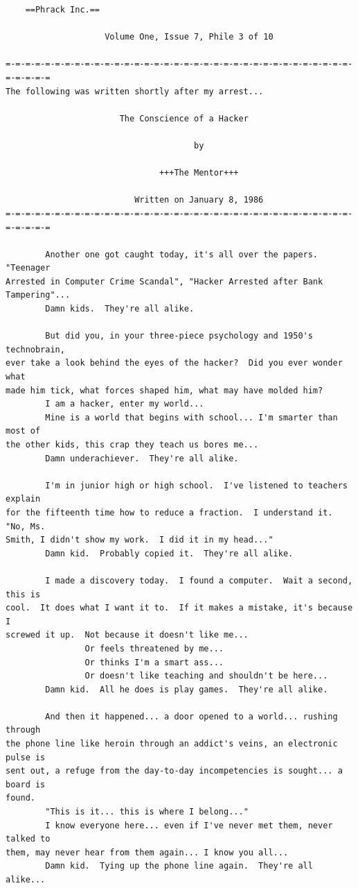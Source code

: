 \documentclass [titlepage, 12pt]{article}
\begin{document}
\pagebreak
\setlength\hoffset{-1cm}
\begin{verbatim}
    ==Phrack Inc.==

                    Volume One, Issue 7, Phile 3 of 10

=-=-=-=-=-=-=-=-=-=-=-=-=-=-=-=-=-=-=-=-=-=-=-=-=-=-=-=-=-=-=-=-=-=-=-=-=-=-=-=
The following was written shortly after my arrest...

                       The Conscience of a Hacker

                                      by

                               +++The Mentor+++

                          Written on January 8, 1986
=-=-=-=-=-=-=-=-=-=-=-=-=-=-=-=-=-=-=-=-=-=-=-=-=-=-=-=-=-=-=-=-=-=-=-=-=-=-=-=

        Another one got caught today, it's all over the papers.  "Teenager
Arrested in Computer Crime Scandal", "Hacker Arrested after Bank Tampering"...
        Damn kids.  They're all alike.

        But did you, in your three-piece psychology and 1950's technobrain,
ever take a look behind the eyes of the hacker?  Did you ever wonder what
made him tick, what forces shaped him, what may have molded him?
        I am a hacker, enter my world...
        Mine is a world that begins with school... I'm smarter than most of
the other kids, this crap they teach us bores me...
        Damn underachiever.  They're all alike.

        I'm in junior high or high school.  I've listened to teachers explain
for the fifteenth time how to reduce a fraction.  I understand it.  "No, Ms.
Smith, I didn't show my work.  I did it in my head..."
        Damn kid.  Probably copied it.  They're all alike.

        I made a discovery today.  I found a computer.  Wait a second, this is
cool.  It does what I want it to.  If it makes a mistake, it's because I
screwed it up.  Not because it doesn't like me...
                Or feels threatened by me...
                Or thinks I'm a smart ass...
                Or doesn't like teaching and shouldn't be here...
        Damn kid.  All he does is play games.  They're all alike.

        And then it happened... a door opened to a world... rushing through
the phone line like heroin through an addict's veins, an electronic pulse is
sent out, a refuge from the day-to-day incompetencies is sought... a board is
found.
        "This is it... this is where I belong..."
        I know everyone here... even if I've never met them, never talked to
them, may never hear from them again... I know you all...
        Damn kid.  Tying up the phone line again.  They're all alike...


\end{verbatim}
\end{document}
